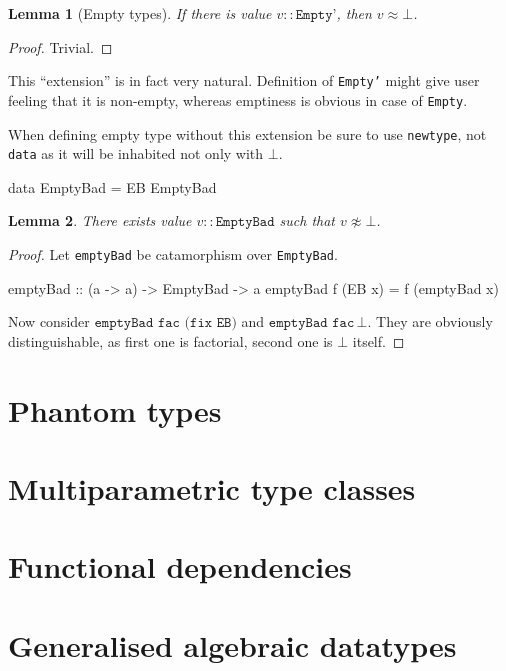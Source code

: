 \documentclass[11pt,oneside,draft]{fithesis2}
\newtheorem{lemma}{Lemma}
\begin{document}
\begin{lemma}[Empty types]
\label{emptyTypes}
If there is value \(v :: \texttt{Empty'}\), then \(v \approx \bot\).
\end{lemma}

\begin{proof}
Trivial. %
\end{proof}

This ``extension'' is in fact very natural. Definition of \texttt{Empty'}
might give user feeling that it is non-empty, whereas emptiness is
obvious in case of \texttt{Empty}.

When defining empty type without this extension be sure to use
\texttt{newtype}, not \texttt{data} as it will be inhabited not only with \(\bot\).
\begin{code}
data EmptyBad = EB EmptyBad
\end{code}

\begin{lemma}
There exists value \(v :: \texttt{EmptyBad}\) such that \(v \not \approx \bot\).
\end{lemma}

\begin{proof}
Let \texttt{emptyBad} be catamorphism over \texttt{EmptyBad}.
\begin{code}
emptyBad :: (a -> a) -> EmptyBad -> a
emptyBad f (EB x) = f (emptyBad x)
\end{code}
Now consider \(\texttt{emptyBad fac (fix EB)}\) and \(\texttt{emptyBad fac} \, \bot\).
They are obviously distinguishable, as first one is factorial, second one is \(\bot\) itself.
\end{proof}

\section{Phantom types}

\section{Multiparametric type classes}

\section{Functional dependencies}

\section{Generalised algebraic datatypes}
\end{document}
